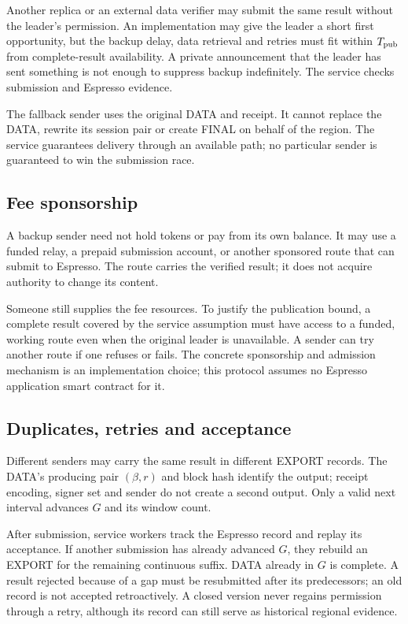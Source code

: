 \documentclass[11pt,a4paper]{article}
\newcounter{protocol}
\begin{document}
Another replica or an external data verifier may submit the same result
without the leader's permission. An implementation may give the leader a
short first opportunity, but the backup delay, data retrieval and retries
must fit within $T_{\rm pub}$ from complete-result availability. A private
announcement that the leader has sent something is not enough to suppress
backup indefinitely. The service checks submission and Espresso evidence.

The fallback sender uses the original DATA and receipt. It cannot replace
the DATA, rewrite its session pair or create FINAL on behalf of the region.
The service guarantees delivery through an available path; no particular
sender is guaranteed to win the submission race.

\subsection{Fee sponsorship}
A backup sender need not hold tokens or pay from its own balance. It may
use a funded relay, a prepaid submission account, or another sponsored
route that can submit to Espresso. The route carries the verified result;
it does not acquire authority to change its content.

Someone still supplies the fee resources. To justify the publication
bound, a complete result covered by the service assumption must have access to a funded,
working route even when the original leader is unavailable. A sender can
try another route if one refuses or fails. The concrete sponsorship and
admission mechanism is an implementation choice; this protocol assumes
no Espresso application smart contract for it.

\subsection{Duplicates, retries and acceptance}
Different senders may carry the same result in different EXPORT records.
The DATA's producing pair $(\beta,r)$ and block hash identify the output;
receipt encoding, signer set and sender do not create a second output.
Only a valid next interval advances $G$ and its window count.

After submission, service workers track the Espresso record and replay
its acceptance. If another submission has already advanced $G$, they
rebuild an EXPORT for the remaining continuous suffix. DATA already in
$G$ is complete. A result rejected because of a gap must be resubmitted
after its predecessors; an old record is not accepted retroactively.
A closed version never regains permission through a retry, although its
record can still serve as historical regional evidence.
\end{document}
